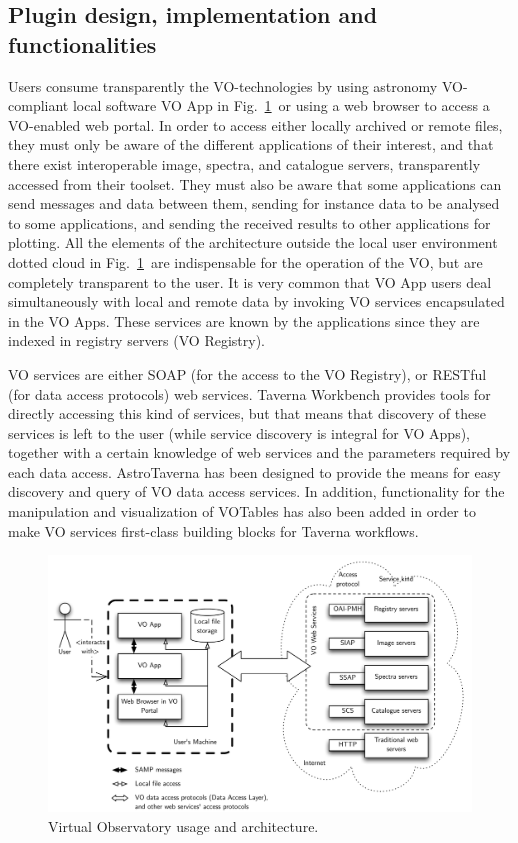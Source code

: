 \documentclass{aa}
\begin{document}
\subsection{Plugin design, implementation and functionalities}
\label{Opening}

Users consume transparently the VO-technologies by using astronomy VO-compliant local software \textendash VO App in Fig.~\ref{fig:VOArch}\textendash\ or using a web browser to access a VO-enabled web portal. In order to access either locally archived or remote files, they must only be aware of the different applications of their interest, and that there exist interoperable image, spectra, and catalogue servers, transparently accessed from their toolset. They must also be aware that some applications can send messages and data between them, sending for instance data to be analysed to some applications, and sending the received results to other applications for plotting. All the elements of the architecture outside the local user environment \textendash dotted cloud in Fig.~\ref{fig:VOArch}\textendash\ are indispensable for the operation of the VO, but are completely transparent to the user. It is very common that VO App users deal simultaneously with local and remote data by invoking VO services encapsulated in the VO Apps. These services are known by the applications since they are indexed in registry servers (VO Registry).

VO services are either SOAP (for the access to the VO Registry), or RESTful (for data access protocols) web services. Taverna Workbench provides tools for directly accessing this kind of services, but that means that discovery of these services is left to the user (while service discovery is integral for VO Apps), together with a certain knowledge of web services and the parameters required by each data access. AstroTaverna has been designed to provide the means for easy discovery and query of VO data access services. In addition, functionality for the manipulation and visualization of VOTables has also been added in order to make VO services first-class building blocks for Taverna workflows.

\begin{figure}[tb]
\centering 
\includegraphics[width=0.99\columnwidth]{VOArch}
\caption{Virtual Observatory usage and architecture.}
\label{fig:VOArch}
\end{figure}
\end{document}
